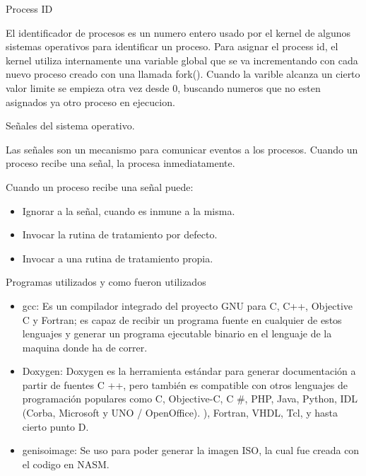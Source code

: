 \documentclass[12pt, a4paper]{report}
\begin{document}
\begin{center}


Process ID


\bigskip

El identificador de procesos es un numero entero usado por el kernel de algunos sistemas operativos para identificar un proceso.
Para asignar el process id, el kernel utiliza internamente una variable global que se va incrementando con cada nuevo proceso creado con una llamada fork(). Cuando la varible alcanza un cierto valor limite se empieza otra vez desde 0, buscando numeros que no esten asignados ya otro proceso en ejecucion.

\bigskip

Señales del sistema operativo.

\bigskip

Las señales son un mecanismo para comunicar eventos a los procesos.
Cuando un proceso recibe una señal, la procesa inmediatamente.


\bigskip

Cuando un proceso recibe una señal puede:
\begin{flushleft}
\begin{itemize}
\item Ignorar a la señal, cuando es inmune a la misma.
\item Invocar la rutina de tratamiento por defecto.
\item Invocar a una rutina de tratamiento propia.
\end{itemize}
\end{flushleft}

\bigskip

\end{center}




\newpage

\begin{center}
Programas utilizados y como fueron utilizados
\end{center}

\bigskip
\bigskip

\begin{flushleft}
\begin{itemize}
\item gcc: Es un compilador integrado del proyecto GNU para C, C++, Objective C y Fortran; es capaz de recibir un programa fuente en cualquier de estos lenguajes y generar un programa ejecutable binario en el lenguaje de la maquina donde ha de correr.
\item Doxygen: Doxygen es la herramienta estándar para generar documentación a partir de fuentes C ++, pero también es compatible con otros lenguajes de programación populares como C, Objective-C, C #, PHP, Java, Python, IDL (Corba, Microsoft y UNO / OpenOffice). ), Fortran, VHDL, Tcl, y hasta cierto punto D.
\item genisoimage: Se uso para poder generar la imagen ISO, la cual fue creada con el codigo en NASM.
\end{itemize}
\end{flushleft}
\end{document}
